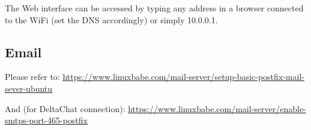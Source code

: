 \documentclass[11pt,a4paper]{article}
\begin{document}
The Web interface can be accessed by typing any address in a browser
connected to the WiFi (set the DNS accordingly) or simply 10.0.0.1.

\subsection{Email}

Please refer to:
\url{https://www.linuxbabe.com/mail-server/setup-basic-postfix-mail-sever-ubuntu}

And (for DeltaChat connection):
\url{https://www.linuxbabe.com/mail-server/enable-smtps-port-465-postfix}





\end{document}
